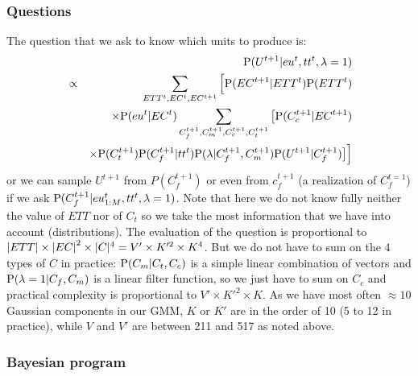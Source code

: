 \subsubsection{Questions}
The question that we ask to know which units to produce is:
\begin{eqnarray}
 & & \mathrm{P}(U^{t+1} | eu^t, tt^t, \lambda = 1) \\
 & \propto & \sum_{ETT^t, EC^t, EC^{t+1}}\Big[\mathrm{P}(EC^{t+1}|ETT^t)\mathrm{P}(ETT^t)\\
 & & \times \mathrm{P}(eu^t|EC^t) \sum_{C_f^{t+1},C_m^{t+1},C_c^{t+1},C_t^{t+1}}\big[\mathrm{P}(C_c^{t+1}|EC^{t+1})\\
 & & \times \mathrm{P}(C_{t}^{t+1})\mathrm{P}(C_{f}^{t+1}|tt^{t}) \mathrm{P}(\lambda|C_{f}^{t+1},C_{m}^{t+1}) \mathrm{P}(U^{t+1}|C_f^{t+1})\big]\Big]
\end{eqnarray}
or we can sample $U^{t+1}$ from $P(C_f^{t+1})$ or even from $c_f^{t+1}$ (a realization of $C_f^{t=1}$) if we ask $\mathrm{P}(C_f^{t+1} | eu_{1:M}^t, tt^t, \lambda = 1)$. Note that here we do not know fully neither the value of $ETT$ nor of $C_t$ so we take the most information that we have into account (distributions). The evaluation of the question is proportional to $\left\lvert ETT\right\rvert\times \left\lvert EC\right\rvert^2\times |C|^4 = V'\times K'^2 \times K^4$. But we do not have to sum on the 4 types of $C$ in practice: $\mathrm{P}(C_m|C_t,C_c)$ is a simple linear combination of vectors and $\mathrm{P}(\lambda=1|C_f,C_m)$ is a linear filter function, so we just have to sum on $C_c$ and practical complexity is proportional to $V'\times K'^2 \times K$. As we have most often $\approx 10$ Gaussian components in our GMM, $K$ or $K'$ are in the order of 10 (5 to 12 in practice), while $V$ and $V'$ are between 211 and 517 as noted above.

\subsubsection{Bayesian program}

